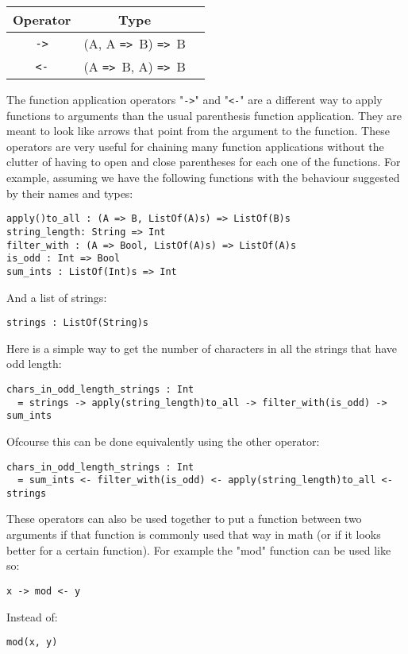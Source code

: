 \documentclass{article}
\def\ra{\texttt{=>}\ }
\begin{document}
\begin{center}
\begin{tabular}{ |c|c|c| } 
\hline
Operator & Type \\ 
\hline
\hline
\texttt{->} & (A, A \ra B) \ra B \\
\hline
\texttt{<-} & (A \ra B, A) \ra B \\
\hline
\end{tabular}
\end{center}
The function application operators "\texttt{->}" and "\texttt{<-}" are a
different way to apply functions to arguments than the usual parenthesis
function application.  They are meant to look like arrows that point from the
argument to the function.  These operators are very useful for chaining many
function applications without the clutter of having to open and close
parentheses for each one of the functions.  For example, assuming we have the
following functions with the behaviour suggested by their names and types:
\begin{verbatim}
apply()to_all : (A => B, ListOf(A)s) => ListOf(B)s
string_length: String => Int
filter_with : (A => Bool, ListOf(A)s) => ListOf(A)s
is_odd : Int => Bool
sum_ints : ListOf(Int)s => Int
\end{verbatim}
And a list of strings:
\begin{verbatim}
strings : ListOf(String)s
\end{verbatim}
Here is a simple way to get the number of characters in all the strings that have 
odd length:
\begin{verbatim}
chars_in_odd_length_strings : Int
  = strings -> apply(string_length)to_all -> filter_with(is_odd) -> sum_ints
\end{verbatim}
Ofcourse this can be done equivalently using the other operator:
\begin{verbatim}
chars_in_odd_length_strings : Int
  = sum_ints <- filter_with(is_odd) <- apply(string_length)to_all <- strings

\end{verbatim}
These operators can also be used together to put a function between two arguments
if that function is commonly used that way in math (or if it looks better for a
certain function). For example the "mod" function can be used like so:
\begin{center}
\texttt{x -> mod <- y}
\end{center}
Instead of:
\begin{center}
\texttt{mod(x, y)}
\end{center}
\end{document}

